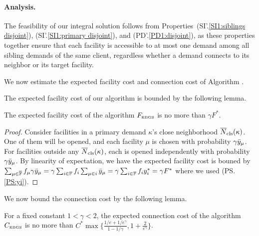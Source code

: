
\paragraph{Analysis.}
The feasibility of our integral solution follows from
Properties~(SI'.\ref{SI1:siblings disjoint}), (SI'.\ref{SI1:primary
  disjoint}), and (PD'.\ref{PD1:disjoint}), as these properties together
ensure that each facility is accessible to at most one demand among
all sibling demands of the same client, regardless whether a demand
connects to its neighbor or its target facility.

We now estimate the expected facility cost and connection cost of
Algorithm {\EBGS}.

The expected facility cost of our algorithm is bounded by the
following lemma.

\begin{lemma} \label{lem: EBGS facility cost}
  The expected facility cost of the algorithm $F_{\mbox{\tiny\rm EBGS}}$ is no more
  than $\gamma F^\ast$.
\end{lemma}
\begin{proof}
  Consider facilities in a primary demand $\kappa$'s close
  neighborhood ${\overline{N}}_{\text{cls}}(\kappa)$. One of them will be opened, and
  each facility $\mu$ is chosen with probability $\gamma
  {\bar y}_{\mu}$. For facilities outside any ${\overline{N}}_{\text{cls}}(\kappa)$, each
  is opened independently with probability $\gamma {\bar y}_{\mu}$. By
  linearity of expectation, we have the expected facility cost is
  bouned by $\sum_{\mu \in \overline{\mathbb{F}}} f_\mu \gamma {\bar y}_{\mu} =
  \gamma \sum_{i\in \mathbb{F}} f_i \sum_{\mu\in i} {\bar y}_{\mu} =
  \gamma \sum_{i \in \mathbb{F}} f_i y_i^\ast = \gamma F^\ast$ where we
  used (PS.\ref{PS:yi}).

\end{proof}

We now bound the connection cost by the following lemma.
\begin{lemma}\label{lem: EBGS connection cost}
  For a fixed constant $1 < \gamma < 2$, the expected connection cost
  of the algorithm $C_{\mbox{\tiny\rm EBGS}}$ is no more than
  $C^\ast\max\{\frac{1/e+1/e^\gamma}{1-1/\gamma},
  1+\frac{2}{e^\gamma}\}$.
\end{lemma}

